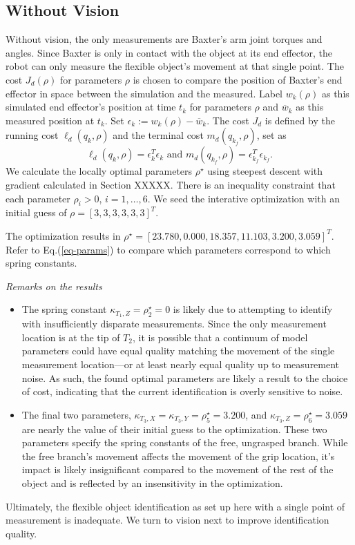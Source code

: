 \documentclass[runningheads,a4paper]{llncs}
\begin{document}
\subsection{Without Vision \label{sec-no_vis}}
Without vision, the only measurements are Baxter's arm joint torques and angles.  Since Baxter is only in contact with the object at its end effector, the robot can only measure the flexible object's movement at that single point. The cost $J_d(\rho)$ for parameters $\rho$ is chosen to compare the position of Baxter's end effector in space between the simulation and the measured.  Label $w_k(\rho)$ as this simulated end effector's position at time $t_k$ for parameters $\rho$ and $\overline{w}_k$ as this measured position at $t_k$.  Set $\epsilon_k := w_k(\rho)-\overline{w}_k$.  The cost $J_d$ is defined by the running cost $\ell_d(q_k,\rho)$ and the terminal cost $m_d(q_{k_f},\rho)$, set as
\[
\ell_d(q_k,\rho) = \epsilon_k^T\epsilon_k \textrm{ and } m_d(q_{k_f},\rho) = \epsilon_{k_f}^T\epsilon_{k_f}.
\]
We calculate the locally optimal parameters $\rho^\star$ using steepest descent with gradient calculated in Section XXXXX. There is an inequality constraint that each parameter $\rho_i>0$, $i = 1,\ldots,6$. We seed the interative optimization with an initial guess of $\rho = [3, 3, 3, 3, 3, 3]^T$.  %

The optimization results in $\rho^\star = [23.780,  0.000 , 18.357 , 11.103 , 3.200,  3.059]^T$. Refer to Eq.(\ref{eq-params}) to compare which parameters correspond to which spring constants. 

\emph{Remarks on the results}
\begin{itemize}
\item The spring constant $\kappa_{T_1,Z} = \rho^\star_2 = 0$ is likely due to attempting to identify with insufficiently disparate measurements. Since the only measurement location is at the tip of $T_2$, it is possible that a continuum of model parameters could have equal quality matching the movement of the single measurement location---or at least nearly equal quality up to measurement noise. As such, the found optimal parameters are likely a result to the choice of cost, indicating that the current identification is overly sensitive to noise.
\item The final two parameters, $\kappa_{T_3,X} = \kappa_{T_3,Y} = \rho^\star_5 = 3.200$, and $\kappa_{T_3,Z} = \rho^\star_6 = 3.059$ are nearly the value of their initial guess to the optimization. These two parameters specify the spring constants of the free, ungrasped branch. While the free branch's movement affects the movement of the grip location, it's impact is likely insignificant compared to the movement of the rest of the object and is reflected by an insensitivity in the optimization.
\end{itemize}
Ultimately, the flexible object identification as set up here with a single point of measurement is inadequate. We turn to vision next to improve identification quality.
\end{document}
